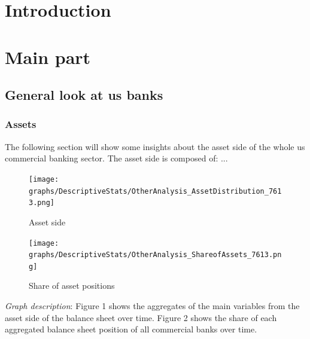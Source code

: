 \documentclass[12pt, a4paper]{article} %
\begin{document}
\tableofcontents
\newpage
{}




\section{Introduction}


\section{Main part}

\subsection{General look at us banks}

\subsubsection{Assets}

The following section will show some insights about the asset side of the whole us commercial banking sector. The asset side is composed of: ... 

\begin{figure}[hbtp]
\centering
\caption{Asset side}
\texttt{[image: graphs/DescriptiveStats/OtherAnalysis\_AssetDistribution\_7613.png]}
\end{figure}

\begin{figure}[hbtp]
\centering
\caption{Share of asset positions}
\texttt{[image: graphs/DescriptiveStats/OtherAnalysis\_ShareofAssets\_7613.png]}
\end{figure}


\noindent \textit{Graph description}: Figure 1 shows the aggregates of the main variables from the asset side of the balance sheet over time. Figure 2 shows the share of each aggregated balance sheet position of all commercial banks over time.\\
\end{document}
